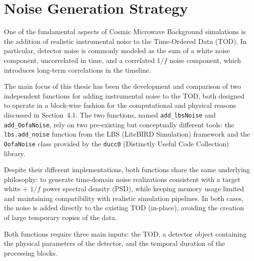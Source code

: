 \section{Noise Generation Strategy}

One of the fundamental aspects of Cosmic Microwave Background simulations is the addition of realistic instrumental noise to the Time-Ordered Data (TOD). In particular, detector noise is commonly modeled as the sum of a white noise component, uncorrelated in time, and a correlated $1/f$ noise component, which introduces long-term correlations in the timeline.

The main focus of this thesis has been the development and comparison of two independent functions for adding instrumental noise to the TOD, both designed to operate in a block-wise fashion for the computational and physical reasons discussed in Section~4.1. The two functions, named \texttt{add\_lbsNoise} and \texttt{add\_OofaNoise}, rely on two pre-existing but conceptually different tools: the \texttt{lbs.add\_noise} function from the LBS (LiteBIRD Simulation) framework and the \texttt{OofaNoise} class provided by the \texttt{ducc0} (Distinctly Useful Code Collection) library.

Despite their different implementations, both functions share the same underlying philosophy: to generate time-domain noise realizations consistent with a target white + $1/f$ power spectral density (PSD), while keeping memory usage limited and maintaining compatibility with realistic simulation pipelines. In both cases, the noise is added directly to the existing TOD (in-place), avoiding the creation of large temporary copies of the data.

Both functions require three main inputs: the TOD, a detector object containing the physical parameters of the detector, and the temporal duration of the processing blocks.


